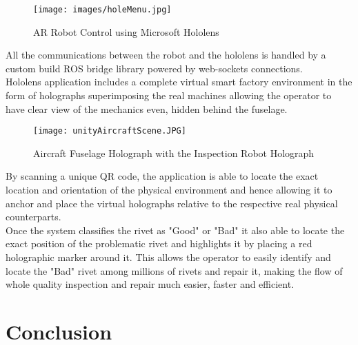 \documentclass{article}
\begin{document}
\begin{figure}[H]
    \centering
    \texttt{[image: images/holeMenu.jpg]}
    \caption{AR Robot Control using Microsoft Hololens}
    \label{fig:hololensMenu}
\end{figure}

All the communications between the robot and the hololens is handled by a custom build ROS bridge library powered by web-sockets connections.\\

Hololens application includes a complete virtual smart factory environment in the form of holographs
superimposing the real machines allowing the operator to have clear view of the mechanics even, hidden behind the fuselage.

\begin{figure}[H]
    \centering
    \texttt{[image: unityAircraftScene.JPG]}
    \caption{Aircraft Fuselage Holograph with the Inspection Robot Holograph}
    \label{fig:aircraftUnityScene}
\end{figure}


By scanning a unique QR code, the application is able to locate the exact location and orientation of the physical environment and hence allowing it to anchor and place the virtual holographs relative to the respective real physical counterparts.\\

Once the system classifies the rivet as "Good" or "Bad" it also able to locate the exact position of the problematic rivet and highlights it by placing a red holographic marker around it. This allows the operator to easily identify and locate the "Bad" rivet among millions of rivets and repair it, making the flow of whole quality inspection and repair much easier, faster and efficient.  

\section{Conclusion}
\end{document}
